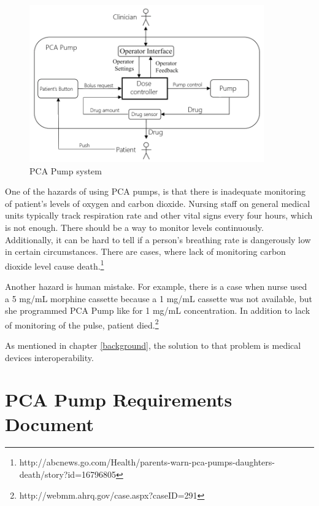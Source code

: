 \begin{figure}[ht]%
    \begin{center}
    	\includegraphics[width=0.9\textwidth]{figures/pca-pump-system.png}    	
    \end{center}
    \caption{PCA Pump system}
    \label{figure:pca-pump-system}
\end{figure}

One of the hazards of using PCA pumps, is that there is inadequate monitoring of patient's levels of oxygen and carbon dioxide. Nursing staff on general medical units typically track respiration rate and other vital signs every four hours, which is not enough. There should be a way to monitor levels continuously. Additionally, it can be hard to tell if a person's breathing rate is dangerously low in certain circumstances. There are cases, where lack of monitoring carbon dioxide level cause death.\footnote{http://abcnews.go.com/Health/parents-warn-pca-pumps-daughters-death/story?id=16796805} 

Another hazard is human mistake. For example, there is a case when nurse used a 5 mg/mL morphine cassette because a 1 mg/mL cassette was not available, but she programmed PCA Pump like for 1 mg/mL concentration. In addition to lack of monitoring of the pulse, patient died.\footnote{http://webmm.ahrq.gov/case.aspx?caseID=291}

As mentioned in chapter \ref{background}, the solution to that problem is medical devices interoperability. 



\section{PCA Pump Requirements Document}
\label{pcapump:requirements-doc}

